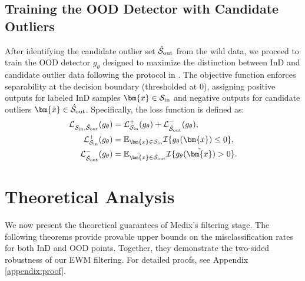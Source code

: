 \documentclass[10pt]{article} %
\theoremstyle{plain}
\theoremstyle{definition}
\begin{document}
\subsection{Training the OOD Detector with Candidate Outliers} \label{sec::train_OOD}
After identifying the candidate outlier set \( \hat{\cal S}_{\rm out}\) from the wild data, we proceed to train the OOD detector \( g_\theta \) designed to maximize the distinction between InD and candidate outlier data following the protocol in \citet{du2024how}. The objective function enforces separability at the decision boundary (thresholded at 0), assigning positive outputs for labeled InD samples \( \bm{{x}}
\in {\cal S}_{\text{in}} \) and negative outputs for candidate outliers \( \bm{\tilde{x}}\in \hat{\cal S}_{\rm out} \). Specifically, the loss function is defined as: 
\begin{align}
    {\mathcal L}_{{\cal S}_{\text{in}}, \hat{\cal S}_{\rm out}}(g_\theta) &= {\mathcal L}^+_{{\cal S}_{\text{in}}}(g_\theta) + {\mathcal L}^-_{\hat{\cal S}_{\rm out}}(g_\theta), \nonumber \\
    {\mathcal L}^+_{{\cal S}_{\text{in}}}(g_\theta) &= \mathbb{E}_{\bm{x} \in {\cal S}_{\text{in}}} \mathbb{\mathcal{I}}\{g_\theta(\bm{x}) \leq 0\}, \nonumber \\
    {\mathcal L}^-_{\hat{\cal S}_{\rm out}}(g_\theta) &= \mathbb{E}_{\tilde{\bm{x}} \in \hat{\cal S}_{\rm out}} \mathbb{\mathcal{I}}\{g_\theta(\tilde{\bm{x}}) > 0\}.
    \label{eq::loss_func} 
\end{align}


\section{Theoretical Analysis}  \label{sec:theory}

We now present the theoretical guarantees of Medix's filtering stage. The following theorems provide provable upper bounds on the misclassification rates for both InD and OOD points. Together, they demonstrate the two-sided robustness of our EWM filtering. For detailed proofs, see Appendix \ref{appendix:proof}.
\end{document}
